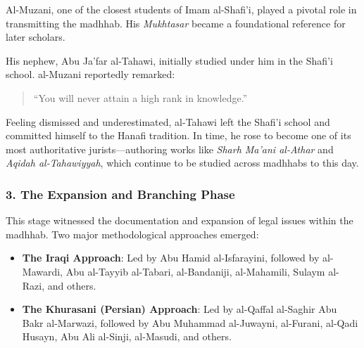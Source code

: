 \documentclass[
  a4paper,
  DIV=11,
  numbers=noendperiod]{scrartcl}
\begin{document}
\begin{tcolorbox}[enhanced jigsaw, breakable, titlerule=0mm, toprule=.15mm, colframe=quarto-callout-note-color-frame, opacityback=0, title=\textcolor{quarto-callout-note-color}{\faInfo}\hspace{0.5em}{The Legacy of al-Muzani and the Departure of al-Tahawi}, colback=white, rightrule=.15mm, colbacktitle=quarto-callout-note-color!10!white, bottomtitle=1mm, toptitle=1mm, arc=.35mm, leftrule=.75mm, bottomrule=.15mm, coltitle=black, left=2mm, opacitybacktitle=0.6]

Al-Muzani, one of the closest students of Imam al-Shafi'i, played a
pivotal role in transmitting the madhhab. His \emph{Mukhtasar} became a
foundational reference for later scholars.

His nephew, Abu Ja'far al-Tahawi, initially studied under him in the
Shafi'i school. al-Muzani reportedly remarked:

\begin{quote}
``You will never attain a high rank in knowledge.''
\end{quote}

Feeling dismissed and underestimated, al-Tahawi left the Shafi'i school
and committed himself to the Hanafi tradition. In time, he rose to
become one of its most authoritative jurists---authoring works like
\emph{Sharh Ma'ani al-Athar} and \emph{Aqidah al-Tahawiyyah}, which
continue to be studied across madhhabs to this day.

\end{tcolorbox}

\subsubsection{3. The Expansion and Branching
Phase}\label{the-expansion-and-branching-phase}

This stage witnessed the documentation and expansion of legal issues
within the madhhab. Two major methodological approaches emerged:

\begin{itemize}
\item
  \textbf{The Iraqi Approach}: Led by Abu Hamid al-Isfarayini, followed
  by al-Mawardi, Abu al-Tayyib al-Tabari, al-Bandaniji, al-Mahamili,
  Sulaym al-Razi, and others.
\item
  \textbf{The Khurasani (Persian) Approach}: Led by al-Qaffal al-Saghir
  Abu Bakr al-Marwazi, followed by Abu Muhammad al-Juwayni, al-Furani,
  al-Qadi Husayn, Abu Ali al-Sinji, al-Masudi, and others.
\end{itemize}
\end{document}
